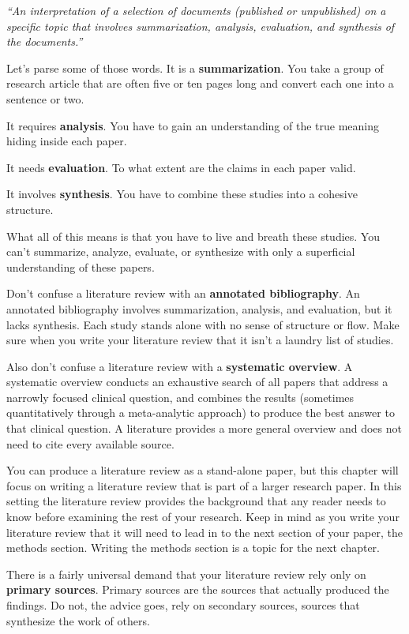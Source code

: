\documentclass[
  letterpaper,
  DIV=11,
  numbers=noendperiod]{scrreprt}
\begin{document}
\begin{tcolorbox}
\emph{``An interpretation of a selection of documents (published or
unpublished) on a specific topic that involves summarization, analysis,
evaluation, and synthesis of the documents.''}

Let's parse some of those words. It is a \textbf{summarization}. You
take a group of research article that are often five or ten pages long
and convert each one into a sentence or two.

It requires \textbf{analysis}. You have to gain an understanding of the
true meaning hiding inside each paper.

It needs \textbf{evaluation}. To what extent are the claims in each
paper valid.

It involves \textbf{synthesis}. You have to combine these studies into a
cohesive structure.

What all of this means is that you have to live and breath these
studies. You can't summarize, analyze, evaluate, or synthesize with only
a superficial understanding of these papers.

Don't confuse a literature review with an \textbf{annotated
bibliography}. An annotated bibliography involves summarization,
analysis, and evaluation, but it lacks synthesis. Each study stands
alone with no sense of structure or flow. Make sure when you write your
literature review that it isn't a laundry list of studies.

Also don't confuse a literature review with a \textbf{systematic
overview}. A systematic overview conducts an exhaustive search of all
papers that address a narrowly focused clinical question, and combines
the results (sometimes quantitatively through a meta-analytic approach)
to produce the best answer to that clinical question. A literature
provides a more general overview and does not need to cite every
available source.

You can produce a literature review as a stand-alone paper, but this
chapter will focus on writing a literature review that is part of a
larger research paper. In this setting the literature review provides
the background that any reader needs to know before examining the rest
of your research. Keep in mind as you write your literature review that
it will need to lead in to the next section of your paper, the methods
section. Writing the methods section is a topic for the next chapter.

There is a fairly universal demand that your literature review rely only
on \textbf{primary sources}. Primary sources are the sources that
actually produced the findings. Do not, the advice goes, rely on
secondary sources, sources that synthesize the work of others.


\end{tcolorbox}
\end{document}
